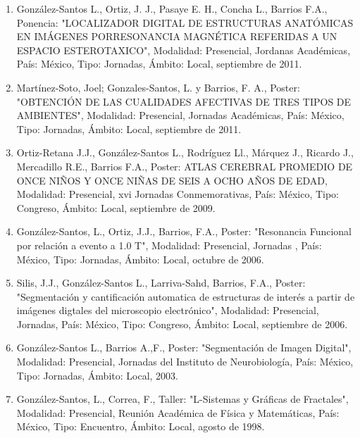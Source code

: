 \begin{enumerate}
\item  González-Santos L., Ortiz, J. J., Pasaye E. H., Concha L., Barrios F.A., Ponencia: "LOCALIZADOR DIGITAL DE ESTRUCTURAS 
ANATÓMICAS EN IMÁGENES PORRESONANCIA MAGNÉTICA REFERIDAS A UN ESPACIO ESTEROTAXICO", Modalidad: Presencial, Jordanas 
Académicas, País: México, Tipo: Jornadas, Ámbito: Local, septiembre de 2011.

\item  Martínez-Soto, Joel; Gonzales-Santos, L. y Barrios, F. A., Poster: "OBTENCIÓN DE LAS CUALIDADES AFECTIVAS DE TRES TIPOS 
DE AMBIENTES", Modalidad: Presencial, Jornadas Académicas, País: México, Tipo: Jornadas, Ámbito: Local, septiembre de 2011.

\item  Ortiz-Retana J.J., González-Santos L., Rodríguez Ll., Márquez J., Ricardo J., Mercadillo R.E., Barrios F.A., Poster: 
ATLAS CEREBRAL PROMEDIO DE ONCE NIÑOS Y ONCE NIÑAS DE SEIS A OCHO AÑOS DE EDAD, Modalidad: Presencial, xvi Jornadas 
Conmemorativas, País: México, Tipo: Congreso, Ámbito: Local, septiembre de 2009.

\item  González-Santos, L., Ortiz, J.J., Barrios, F.A., Poster: "Resonancia Funcional por relación a evento a 1.0 T", 
Modalidad: Presencial, Jornadas , País: México, Tipo: Jornadas, Ámbito: Local, octubre de 2006.

\item  Silis, J.J., González-Santos L., Larriva-Sahd, Barrios, F.A., Poster: "Segmentación y cantificación automatica de 
estructuras de interés a partir de imágenes digtales del microscopio electrónico", Modalidad: Presencial, Jornadas, País: 
México, Tipo: Congreso, Ámbito: Local, septiembre de 2006.

\item  González-Santos L., Barrios A.,F., Poster: "Segmentación de Imagen Digital", Modalidad: Presencial, Jornadas del 
Instituto de Neurobiología, País: México, Tipo: Jornadas, Ámbito: Local, 2003.

\item  González-Santos, L., Correa, F., Taller: "L-Sistemas y Gráficas de Fractales", Modalidad: Presencial, Reunión Académica 
de Física y Matemáticas, País: México, Tipo: Encuentro, Ámbito: Local, agosto de 1998.

\end{enumerate}



